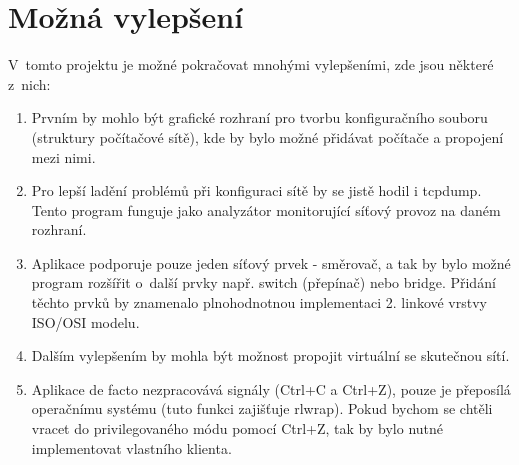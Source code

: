 \chapter{Možná vylepšení}

V~tomto projektu je možné pokračovat mnohými vylepšeními, zde jsou některé z~nich:

\begin{enumerate}
\item Prvním by mohlo být grafické rozhraní pro tvorbu konfiguračního souboru (struktury počítačové sítě), kde by bylo možné přidávat počítače a propojení mezi nimi.                                                                                                                                                                     

\item Pro lepší ladění problémů při konfiguraci sítě by se jistě hodil i tcpdump. Tento program funguje jako analyzátor monitorující síťový provoz na daném rozhraní.

\item Aplikace podporuje pouze jeden síťový prvek - směrovač, a tak by bylo možné program rozšířit o~další prvky např. switch (přepínač) nebo bridge. Přidání těchto prvků by znamenalo plnohodnotnou implementaci 2. linkové vrstvy ISO/OSI modelu.

\item Dalším vylepšením by mohla být možnost propojit virtuální se skutečnou sítí. 

\item Aplikace de facto nezpracovává signály (Ctrl+C a Ctrl+Z), pouze je přeposílá operačnímu systému (tuto funkci zajišťuje rlwrap). Pokud bychom se chtěli vracet do privilegovaného módu pomocí Ctrl+Z, tak by bylo nutné implementovat vlastního klienta.
\end{enumerate}







